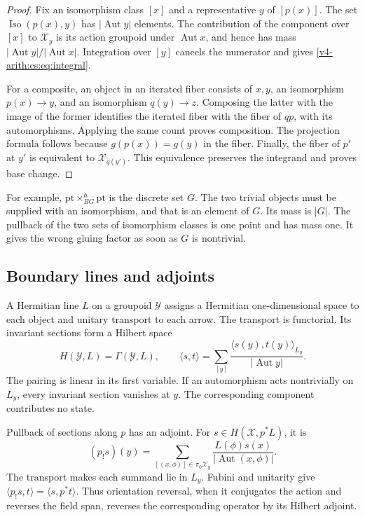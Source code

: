 \begin{proof}
Fix an isomorphism class \([x]\) and a representative \(y\) of \([p(x)]\).
The set \(\operatorname{Iso}(p(x),y)\) has \(|\operatorname{Aut}y|\)
elements. The contribution of the component over \([x]\) to \(\mathcal X_y\)
is its action groupoid under \(\operatorname{Aut}x\), and hence has mass
\(|\operatorname{Aut}y|/|\operatorname{Aut}x|\). Integration over \([y]\)
cancels the numerator and gives \eqref{v4-arith:cs:eq:integral}.

For a composite, an object in an iterated fiber consists of \(x,y\), an
isomorphism \(p(x)\to y\), and an isomorphism \(q(y)\to z\). Composing the
latter with the image of the former identifies the iterated fiber with the
fiber of \(qp\), with its automorphisms. Applying the same count proves
composition. The projection formula follows because \(g(p(x))=g(y)\) in the
fiber. Finally, the fiber of \(p'\) at \(y'\) is equivalent to \(\mathcal
X_{q(y')}\). This equivalence preserves the integrand and proves base
change.
\end{proof}

For example, \(\mathrm{pt}\times^h_{BG}\mathrm{pt}\) is the discrete set
\(G\). The two trivial objects must be supplied with an isomorphism, and
that is an element of \(G\). Its mass is \(|G|\). The pullback of the two
sets of isomorphism classes is one point and has mass one. It gives the
wrong gluing factor as soon as \(G\) is nontrivial.

\subsection{Boundary lines and adjoints}

A Hermitian line \(L\) on a groupoid \(\mathcal Y\) assigns a Hermitian
one-dimensional space to each object and unitary transport to each arrow.
The transport is functorial. Its invariant sections form a Hilbert space
\begin{equation}
 H(\mathcal Y,L)=\Gamma(\mathcal Y,L),\qquad
 \langle s,t\rangle
 =\sum_{[y]}\frac{\langle s(y),t(y)\rangle_{L_y}}
                         {|\operatorname{Aut}y|}.
 \label{v4-arith:cs:eq:boundary-hilbert}
\end{equation}
The pairing is linear in its first variable. If an automorphism acts
nontrivially on \(L_y\), every invariant section vanishes at \(y\). The
corresponding component contributes no state.

Pullback of sections along \(p\) has an adjoint. For \(s\in H(\mathcal
X,p^*L)\), it is
\begin{equation}
 (p_!s)(y)=
 \sum_{[(x,\phi)]\in\pi_0\mathcal X_y}
  \frac{L(\phi)s(x)}{|\operatorname{Aut}(x,\phi)|}.
 \label{v4-arith:cs:eq:line-push}
\end{equation}
The transport makes each summand lie in \(L_y\). Fubini and unitarity give
\(\langle p_!s,t\rangle=\langle s,p^*t\rangle\). Thus orientation reversal,
when it conjugates the action and reverses the field span, reverses the
corresponding operator by its Hilbert adjoint.

